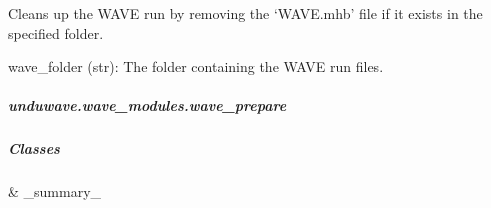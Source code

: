 \documentclass[letterpaper,10pt,english]{sphinxmanual}
\begin{document}
\begin{fulllineitems}
\begin{fulllineitems}
\begin{description}
\end{description}

\end{fulllineitems}


\begin{fulllineitems}
\label{\detokenize{autoapi/unduwave/wave_modules/wave_postprocess/index:unduwave.wave_modules.wave_postprocess.wave_postprocess.cleanup}}
\pysigstartsignatures
{}
\pysigstopsignatures
\sphinxAtStartPar
Cleans up the WAVE run by removing the ‘WAVE.mhb’ file if it exists in the specified folder.
\begin{description}
\sphinxAtStartPar
wave\_folder (str): The folder containing the WAVE run files.

\end{description}

\end{fulllineitems}


\end{fulllineitems}


\sphinxstepscope


\subparagraph{unduwave.wave\_modules.wave\_prepare}
\label{\detokenize{autoapi/unduwave/wave_modules/wave_prepare/index:module-unduwave.wave_modules.wave_prepare}}\label{\detokenize{autoapi/unduwave/wave_modules/wave_prepare/index:unduwave-wave-modules-wave-prepare}}\label{\detokenize{autoapi/unduwave/wave_modules/wave_prepare/index::doc}}

\subparagraph{Classes}
\label{\detokenize{autoapi/unduwave/wave_modules/wave_prepare/index:classes}}

\begin{savenotes}\sphinxattablestart
\sphinxthistablewithglobalstyle
\sphinxthistablewithnovlinesstyle
\centering
\begin{tabulary}{\linewidth}[t]{}
\sphinxtoprule
\sphinxtableatstartofbodyhook
\sphinxAtStartPar
{\hyperref[\detokenize{autoapi/unduwave/wave_modules/wave_prepare/index:unduwave.wave_modules.wave_prepare.wave_prepare}]{}}
&
\sphinxAtStartPar
\_summary\_
\\
\sphinxbottomrule
\end{tabulary}
\sphinxtableafterendhook\par
\sphinxattableend\end{savenotes}
\end{document}
